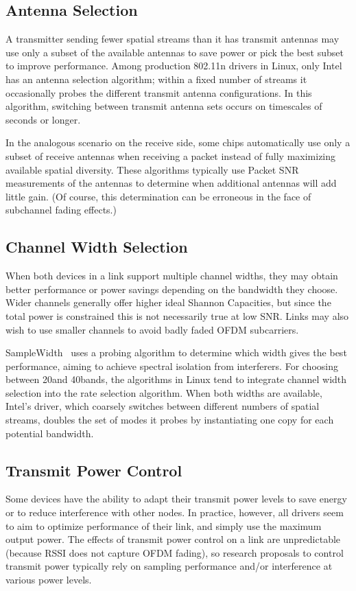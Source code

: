 \subsection{Antenna Selection}
A transmitter sending fewer spatial streams than it has transmit antennas may use only a subset of the available antennas to save power or pick the best subset to improve performance. Among production 802.11n drivers in Linux, only Intel~\cite{iwlwifi} has an antenna selection algorithm; within a fixed number of streams it occasionally probes the different transmit antenna configurations. In this algorithm, switching between transmit antenna sets occurs on timescales of seconds or longer.

In the analogous scenario on the receive side, some chips automatically use only a subset of receive antennas when receiving a packet instead of fully maximizing available spatial diversity. These algorithms typically use Packet SNR measurements of the antennas to determine when additional antennas will add little gain. (Of course, this determination can be erroneous in the face of subchannel fading effects.)

\subsection{Channel Width Selection}
When both devices in a link support multiple channel widths, they may obtain better performance or power savings depending on the bandwidth they choose. Wider channels generally offer higher ideal Shannon Capacities, but since the total power is constrained this is not necessarily true at low SNR. Links may also wish to use smaller channels to avoid badly faded OFDM subcarriers.

SampleWidth~\cite{Chandra_SampleWidth} uses a probing algorithm to determine which width gives the best performance, aiming to achieve spectral isolation from interferers. For choosing between 20\MHz and 40\MHz bands, the algorithms in Linux tend to integrate channel width selection into the rate selection algorithm. When both widths are available, Intel's driver, which coarsely switches between different numbers of spatial streams, doubles the set of modes it probes by instantiating one copy for each potential bandwidth.

\subsection{Transmit Power Control}
Some devices have the ability to adapt their transmit power levels to save energy or to reduce interference with other nodes. In practice, however, all drivers seem to aim to optimize performance of their link, and simply use the maximum output power. The effects of transmit power control on a link are unpredictable (because RSSI does not capture OFDM fading), so research proposals to control transmit power typically rely on sampling performance and/or interference at various power levels.

